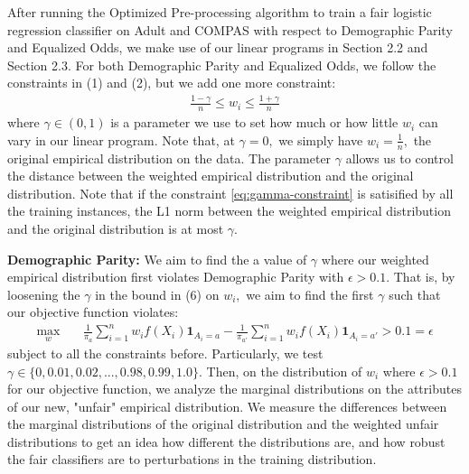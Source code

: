\documentclass[11pt]{article}
\newcommand{\kibitz}[2]{\ifnum\Comments=1{\color{#1}{#2}}\fi}
\newcommand{\dm}[1]{\kibitz{magenta}{[Deb: #1]}}
\newcommand{\eye}{\mathbf{1}}
\begin{document}
\par
After running the Optimized Pre-processing algorithm to train a fair logistic regression classifier on Adult and COMPAS with respect to Demographic Parity and Equalized Odds, we make use of our linear programs in Section 2.2 and Section 2.3. For both Demographic Parity and Equalized Odds, we follow the constraints in (1) and (2), but we add one more constraint:
\begin{align}\label{eq:gamma-constraint}
    \frac{1 - \gamma}{n} \leq w_i \leq \frac{1 + \gamma}{n}
\end{align}
where $\gamma \in (0,1)$ is a parameter we use to set how much or how little $w_i$ can vary in our linear program. Note that, at $\gamma = 0,$ we simply have $w_i = \frac{1}{n},$ the original empirical distribution on the data. The parameter $\gamma$ allows us to control the distance between the weighted empirical distribution and the original distribution. Note that if the constraint \cref{eq:gamma-constraint} is satisified by all the training instances, the L1 norm between the weighted empirical distribution and the original distribution is at most $\gamma$. 
\par
\textbf{Demographic Parity:} We aim to find the a value of $\gamma$ where our weighted empirical distribution first violates Demographic Parity with $\epsilon > 0.1.$ That is, by loosening the $\gamma$ in the bound in (6) on $w_i,$ we aim to find the first $\gamma$ such that our objective function violates:
\begin{align}
    \max_w \quad & \frac{1}{\pi_a} \sum_{i=1}^n w_i f(X_i)\eye_{A_i = a} - \frac{1}{\pi_{a'}} \sum_{i=1}^n w_i f(X_i)\eye_{A_i = a'} > 0.1 = \epsilon
\end{align}
subject to all the constraints before. Particularly, we test $\gamma \in \{0, 0.01, 0.02, ..., 0.98, 0.99, 1.0\}.$ Then, on the distribution of $w_i$ where $\epsilon > 0.1$ for our objective function, we analyze the marginal distributions on the attributes of our new, "unfair" empirical distribution. 
We measure the differences between the marginal distributions of the original distribution and the weighted unfair distributions to get an idea how different the distributions are, and how robust the fair classifiers are to perturbations in the training distribution.
\end{document}

